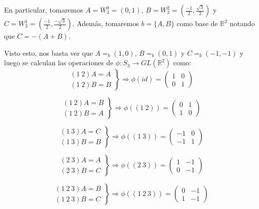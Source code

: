 \documentclass[paper=a4, fontsize=11pt, spanish]{scrartcl}
\begin{document}
\begin{enumerate}
		En particular, tomaremos $A = W_3^0 = (0, 1)$, $\displaystyle B = W_3^2 = \left(\frac{-1}{2},
		\frac{\sqrt{3}}{2}\right)$ y $\displaystyle C = W_3^1 = \left(\frac{-1}{2}, \frac{-\sqrt{3}}{2}\right)$.
		Además, tomaremos $b=\{A, B\}$ como base de $\mathbb{R}^2$ notando que $C = -(A+B)$.
		
		Visto esto, nos basta ver que $A =_b (1, 0)$, $B =_b (0, 1)$ y $C =_b (-1, -1)$ y luego se calculan las
		operaciones de $\phi: S_3 \rightarrow GL\left(\mathbb{R}^2\right)$ como:
		$$\left.\begin{aligned}
			(1\ 2)A = A\\
			(1\ 2)B = B
		\end{aligned}\right\} \Rightarrow\phi(id) = \begin{pmatrix} 1 & 0\\ 0 & 1 \end{pmatrix}$$
		
		$$\left.\begin{aligned}
			(1\ 2)A = B\\
			(1\ 2)B = A
		\end{aligned}\right\} \Rightarrow \phi((1\ 2)) = \begin{pmatrix} 0 & 1\\ 1 & 0 \end{pmatrix}$$
		
		$$\left.\begin{aligned}
			(1\ 3)A = C\\
			(1\ 3)B = B
		\end{aligned}\right\} \Rightarrow \phi((1\ 3)) = \begin{pmatrix} -1 & 0\\ -1 & 1 \end{pmatrix}$$
		
		$$\left.\begin{aligned}
			(2\ 3)A = A\\
			(2\ 3)B = C
		\end{aligned}\right\} \Rightarrow \phi((2\ 3)) = \begin{pmatrix} 1 & -1\\ 0 & -1 \end{pmatrix}$$
		
		$$\left.\begin{aligned}
			(1\ 2\ 3)A = B\\
			(1\ 2\ 3)B = C
		\end{aligned}\right\} \Rightarrow \phi((1\ 2\ 3)) = \begin{pmatrix} 0 & -1\\ 1 & -1 \end{pmatrix}$$
		

\end{enumerate}
\end{document}
